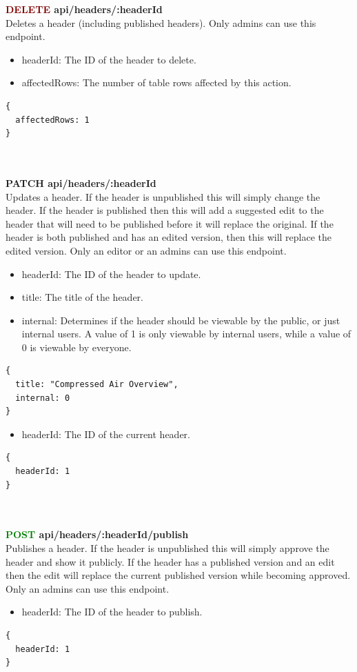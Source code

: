 \documentclass[onecolumn, draftclsnofoot,10pt, compsoc, usenames, dvipsnames]{IEEEtran}
\begin{document}
\noindent
\textbf{\textcolor{Maroon}{DELETE} api/headers/:headerId} \\
Deletes a header (including published headers). Only admins can use this endpoint.
\begin{itemize}
    \item headerId: The ID of the header to delete.
    \item affectedRows: The number of table rows affected by this action.
\end{itemize}
\begin{lstlisting}[caption=Example Response]
{ 
  affectedRows: 1
}
\end{lstlisting}
\\~\\


\noindent
\textbf{\textcolor{BlueGreen}{PATCH} api/headers/:headerId} \\
Updates a header. If the header is unpublished this will simply change the header. If the header is published then this will add a suggested edit to the header that will need to be published before it will replace the original. If the header is both published and has an edited version, then this will replace the edited version. Only an editor or an admins can use this endpoint.
\begin{itemize}
    \item headerId: The ID of the header to update.
    \item title: The title of the header.
    \item internal: Determines if the header should be viewable by the public, or just internal users. A value of 1 is only viewable by internal users, while a value of 0 is viewable by everyone.
\end{itemize}
\begin{lstlisting}[caption=Example Request Body]
{
  title: "Compressed Air Overview",
  internal: 0
}
\end{lstlisting}
\begin{itemize}
  \item headerId: The ID of the current header.
\end{itemize}
\begin{lstlisting}[caption=Example Response]
{ 
  headerId: 1
}
\end{lstlisting}
\\~\\


\noindent
\textbf{\textcolor{Green}{POST} api/headers/:headerId/publish} \\
Publishes a header. If the header is unpublished this will simply approve the header and show it publicly. If the header has a published version and an edit then the edit will replace the current published version while becoming approved. Only an admins can use this endpoint.
\begin{itemize}
    \item headerId: The ID of the header to publish.
\end{itemize}
\begin{lstlisting}[caption=Example Response]
{ 
  headerId: 1
}
\end{lstlisting}
\\~\\
\end{document}
